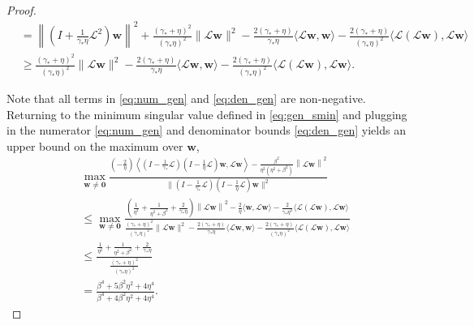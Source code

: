 \documentclass[a4paper,10pt]{article}
\begin{document}
\begin{proof}
\begin{align}
& = \left\|\left(I + \tfrac{1}{{\gamma_*}\eta}\mathcal{L}^2\right)\mathbf{w}\right\|^2
	+ \frac{({\gamma_*}+\eta)^2}{({\gamma_*}\eta)^2}\|\mathcal{L}\mathbf{w}\|^2
	- \frac{2({\gamma_*}+\eta)}{{\gamma_*}\eta}\langle \mathcal{L}\mathbf{w}, \mathbf{w}\rangle
	- \frac{2({\gamma_*}+\eta)}{({\gamma_*}\eta)^2}\langle \mathcal{L}(\mathcal{L}\mathbf{w}),
		\mathcal{L}\mathbf{w}\rangle \nonumber\\
& \geq \frac{({\gamma_*}+\eta)^2}{({\gamma_*}\eta)^2}\|\mathcal{L}\mathbf{w}\|^2
	- \frac{2({\gamma_*}+\eta)}{{\gamma_*}\eta}\langle \mathcal{L}\mathbf{w}, \mathbf{w}\rangle
	- \frac{2({\gamma_*}+\eta)}{({\gamma_*}\eta)^2}\langle \mathcal{L}(\mathcal{L}\mathbf{w}),
		\mathcal{L}\mathbf{w}\rangle . \label{eq:den_gen}
\end{align}
%

Note that all terms in \eqref{eq:num_gen} and \eqref{eq:den_gen} are non-negative.
Returning to the minimum singular value defined in \eqref{eq:gen_smin} and plugging in
the numerator \eqref{eq:num_gen} and denominator bounds \eqref{eq:den_gen} yields
an upper bound on the maximum over $\mathbf{w}$,
%
\begin{align*}
&\max_{\mathbf{w}\neq\mathbf{0}}
	\frac{(-\tfrac{2}{\eta})\left\langle(I - \tfrac{1}{{\gamma_*}}\mathcal{L})(I -
		\tfrac{1}{\eta}\mathcal{L})\mathbf{w},
		\mathcal{L}\mathbf{w} \right\rangle- 
		\frac{\beta^2}{\eta^2(\eta^2+\beta^2)}\left\|\mathcal{L}\mathbf{w} \right\|^2}
	{\|(I - \tfrac{1}{{\gamma_*}}\mathcal{L})(I - \tfrac{1}{\eta}\mathcal{L})\mathbf{w}\|^2} \\
& \leq \max_{\mathbf{w}\neq\mathbf{0}}\frac{\left(\frac{1}{\eta^2} +
		\frac{1}{\eta^2+\beta^2} + \frac{2}{{\gamma_*}\eta}\right)
			\left\|\mathcal{L}\mathbf{w} \right\|^2
		- \frac{2}{\eta}\langle\mathbf{w},\mathcal{L}\mathbf{w}\rangle
		- \frac{2}{{\gamma_*}\eta^2}\langle\mathcal{L}(\mathcal{L}\mathbf{w}),\mathcal{L}\mathbf{w}\rangle}
	{\frac{({\gamma_*}+\eta)^2}{({\gamma_*}\eta)^2}\|\mathcal{L}\mathbf{w}\|^2
	- \frac{2({\gamma_*}+\eta)}{{\gamma_*}\eta}\langle \mathcal{L}\mathbf{w}, \mathbf{w}\rangle
	- \frac{2({\gamma_*}+\eta)}{({\gamma_*}\eta)^2}\langle \mathcal{L}(\mathcal{L}\mathbf{w}),
		\mathcal{L}\mathbf{w}\rangle} \nonumber\\
& \leq \frac{\frac{1}{\eta^2} + \frac{1}{\eta^2+\beta^2}+ \frac{2}{{\gamma_*}\eta}}
	{\frac{({\gamma_*}+\eta)^2}{({\gamma_*}\eta)^2}} \\
& = \frac{\beta^4+5\beta^2\eta^2+4\eta^4}{\beta^4+4\beta^2\eta^2+4\eta^4}.
\end{align*}

\end{proof}
\end{document}
